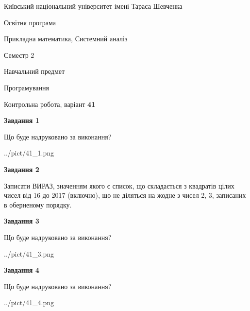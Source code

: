 \documentclass[12pt, ukrainian]{article}
\begin{document}
{{\begin {small}\par
{ \center  Київський національний університет імені Тараса Шевченка \par}
{\parbox {5 cm}{Освітня програма \hfill}{\parbox {8 cm}{Прикладна математика, Системний аналіз \hfill}}\parbox {5 cm}{\hfill Семестр 2}}\par
{\parbox {5 cm} {Навчальний предмет \hfill}\parbox {7 cm}{Програмування \hfill}\parbox {6cm}{\hfill}\par}\vspace{-7pt} \end{small}}{\center Контрольна робота, варіант  \No \textbf
{ 41 }\par}}
{
\begin {large}
{\begin {center}\textbf{Завдання 1}\end {center}}\par
Що буде надруковано за виконання?\par\par
\begin{center}
	{../pict/41_1.png}
\end{center}
\newpage

{\begin {center}\textbf{Завдання 2}\end {center}}\par

Записати ВИРАЗ, значенням якого є список, що складається з квадратів цілих чисел від 16 до 2017 (включно), що не діляться на жодне з чисел 2, 3, записаних в обернено\-му порядку.\par
\newpage

{\begin {center}\textbf{Завдання 3}\end {center}}\par
Що буде надруковано за виконання?
\begin{center}
	{../pict/41_3.png}
\end{center}
\newpage

{\begin {center}\textbf{Завдання 4}\end {center}}\par
Що буде надруковано за виконання?\par
\begin{center}
	{../pict/41_4.png}
\end{center}
\newpage


\end{large}}
\end{document}
